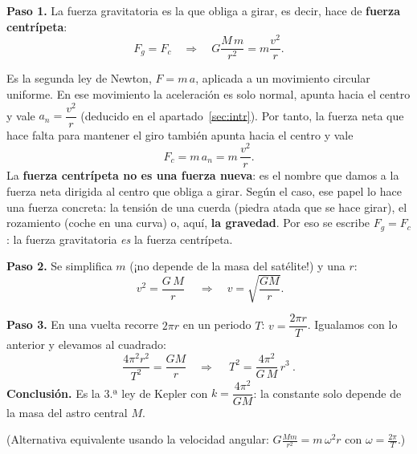\documentclass[11pt,a4paper]{article}
\begin{document}
\begin{minipage}{0.62\textwidth}
\textbf{Paso 1.} La fuerza gravitatoria es la que obliga a girar, es decir, hace de \textbf{fuerza centrípeta}:
\[
F_g=F_c\quad\Longrightarrow\quad G\frac{M\,m}{r^2}=m\frac{v^2}{r}.
\]
\begin{clave}[title={¿De dónde sale $F_c=m\,v^2/r$?}]
Es la segunda ley de Newton, $F=m\,a$, aplicada a un movimiento circular uniforme. En ese movimiento la aceleración es solo normal, apunta hacia el centro y vale $a_n=\dfrac{v^2}{r}$ (deducido en el apartado~\ref{sec:intr}). Por tanto, la fuerza neta que hace falta para mantener el giro también apunta hacia el centro y vale
\[F_c=m\,a_n=m\,\frac{v^2}{r}.\]
La \textbf{fuerza centrípeta no es una fuerza nueva}: es el nombre que damos a la fuerza neta dirigida al centro que obliga a girar. Según el caso, ese papel lo hace una fuerza concreta: la tensión de una cuerda (piedra atada que se hace girar), el rozamiento (coche en una curva) o, aquí, \textbf{la gravedad}. Por eso se escribe $F_g=F_c$: la fuerza gravitatoria \emph{es} la fuerza centrípeta.
\end{clave}
\textbf{Paso 2.} Se simplifica $m$ (¡no depende de la masa del satélite!) y una $r$:
\[
\boxed{\ v^2=\frac{G\,M}{r}\ }\quad\Longrightarrow\quad v=\sqrt{\frac{GM}{r}} .
\]
\end{minipage}\hfill
\begin{minipage}{0.33\textwidth}
\end{minipage}

\textbf{Paso 3.} En una vuelta recorre $2\pi r$ en un periodo $T$: $v=\dfrac{2\pi r}{T}$. Igualamos con lo anterior y elevamos al cuadrado:
\[
\frac{4\pi^2r^2}{T^2}=\frac{GM}{r}\quad\Longrightarrow\quad \boxed{\ T^2=\frac{4\pi^2}{G\,M}\,r^3\ }.
\]
\textbf{Conclusión.} Es la 3.ª ley de Kepler con $k=\dfrac{4\pi^2}{GM}$: la constante solo depende de la masa del astro central $M$.

(Alternativa equivalente usando la velocidad angular: $G\frac{Mm}{r^2}=m\,\omega^2r$ con $\omega=\frac{2\pi}{T}$.)
\end{document}
